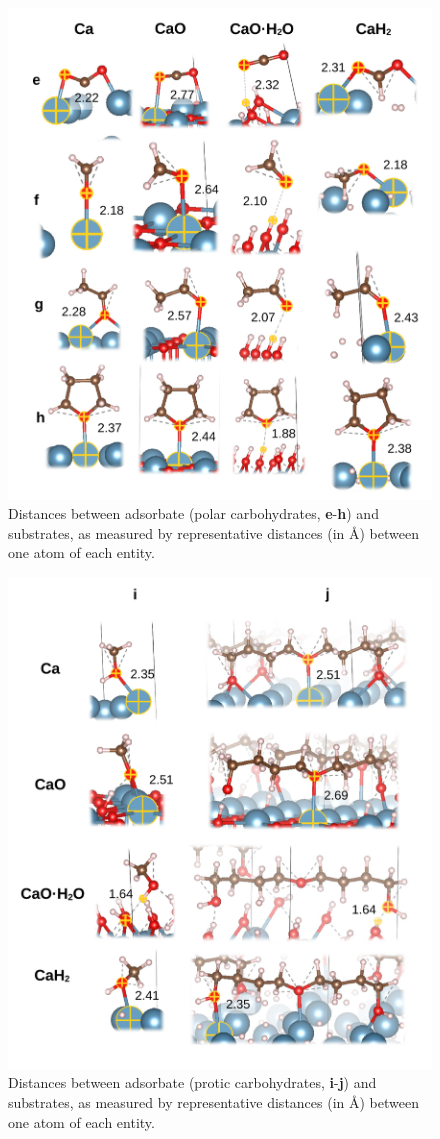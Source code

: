 \documentclass[journal=jpccck,manuscript=article]{achemso}
\begin{document}
\begin{figure}[!h]
\centering
\includegraphics[width=.7\linewidth]{Figure8}
\caption{Distances between adsorbate (polar carbohydrates, \textbf{e}-\textbf{h}) and substrates, as measured by representative distances (in \si{\angstrom}) between one atom of each entity.}
\label{fig:distseh}
\end{figure}

\begin{figure}[!h]
\centering
\includegraphics[width=.7\linewidth]{Figure9}
\caption{Distances between adsorbate (protic carbohydrates, \textbf{i}-\textbf{j}) and substrates, as measured by representative distances (in \si{\angstrom}) between one atom of each entity.}
\label{fig:distsij}
\end{figure}
\end{document}
